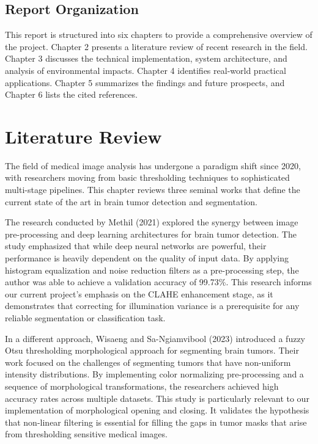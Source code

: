 \documentclass[12pt,a4paper,oneside]{report}
\begin{document}
\section{Report Organization}
This report is structured into six chapters to provide a comprehensive overview of the project. Chapter 2 presents a literature review of recent research in the field. Chapter 3 discusses the technical implementation, system architecture, and analysis of environmental impacts. Chapter 4 identifies real-world practical applications. Chapter 5 summarizes the findings and future prospects, and Chapter 6 lists the cited references.

\chapter{Literature Review}
The field of medical image analysis has undergone a paradigm shift since 2020, with researchers moving from basic thresholding techniques to sophisticated multi-stage pipelines. This chapter reviews three seminal works that define the current state of the art in brain tumor detection and segmentation.

The research conducted by Methil (2021) explored the synergy between image pre-processing and deep learning architectures for brain tumor detection. The study emphasized that while deep neural networks are powerful, their performance is heavily dependent on the quality of input data. By applying histogram equalization and noise reduction filters as a pre-processing step, the author was able to achieve a validation accuracy of 99.73\%. This research informs our current project's emphasis on the CLAHE enhancement stage, as it demonstrates that correcting for illumination variance is a prerequisite for any reliable segmentation or classification task.

In a different approach, Wisaeng and Sa-Ngiamvibool (2023) introduced a fuzzy Otsu thresholding morphological approach for segmenting brain tumors. Their work focused on the challenges of segmenting tumors that have non-uniform intensity distributions. By implementing color normalizing pre-processing and a sequence of morphological transformations, the researchers achieved high accuracy rates across multiple datasets. This study is particularly relevant to our implementation of morphological opening and closing. It validates the hypothesis that non-linear filtering is essential for filling the gaps in tumor masks that arise from thresholding sensitive medical images.
\end{document}
